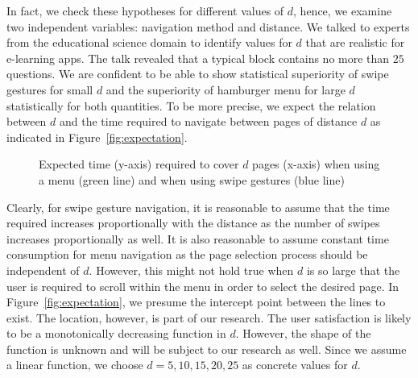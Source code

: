 \documentclass{sig-alternate-05-2015}
\begin{document}
In fact, we check these hypotheses for different values of $d$, hence, we
examine two independent variables: navigation method and distance. We talked to
experts from the educational science domain to identify values for $d$ that
are realistic for e-learning apps. The talk revealed that a typical block
contains no more than $25$ questions. We are confident to be able to show statistical
superiority of swipe gestures for small $d$ and the superiority of hamburger
menu for large $d$ statistically for both quantities.  To be more precise, we
expect the relation between $d$ and the time required to navigate between
pages of distance $d$ as indicated in Figure~\ref{fig:expectation}.
\begin{figure}
	\caption{Expected time (y-axis) required to cover $d$ pages (x-axis) when using a menu (green line) and when using swipe gestures (blue line)}
\end{figure}
Clearly, for swipe gesture navigation, it is reasonable to assume that the
time required increases proportionally with the distance as the number of
swipes increases proportionally as well.  It is also reasonable to assume
constant time consumption for menu navigation as the page selection process
should be independent of $d$. However, this might not hold true when $d$ is so
large that the user is required to scroll within the menu in order to select
the desired page. In Figure~\ref{fig:expectation}, we presume the intercept
point between the lines to exist. The location, however, is part of our
research.  The user satisfaction is likely to be a monotonically decreasing
function in $d$. However, the shape of the function is unknown and will be
subject to our research as well.
Since we assume a linear function, we choose $d = 5, 10, 15, 20, 25$ as concrete
values for $d$.
\end{document}
